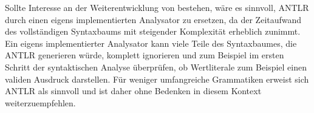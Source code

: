 Sollte Interesse an der Weiterentwicklung von \toya bestehen, wäre es sinnvoll, ANTLR durch einen eigens implementierten Analysator zu ersetzen, da der Zeitaufwand des vollständigen Syntaxbaums mit steigender Komplexität erheblich zunimmt. Ein eigens implementierter Analysator kann viele Teile des Syntaxbaumes, die ANTLR generieren würde, komplett ignorieren und zum Beispiel im ersten Schritt der syntaktischen Analyse überprüfen, ob Wertliterale zum Beispiel einen validen Ausdruck darstellen. Für weniger umfangreiche Grammatiken erweist sich ANTLR als sinnvoll und ist daher ohne Bedenken in diesem Kontext weiterzuempfehlen.
